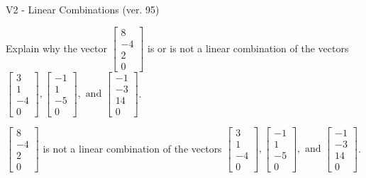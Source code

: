 \begin{exercise}
  \begin{exerciseTitle}V2 - Linear Combinations (ver. 95)\end{exerciseTitle}
  \begin{exerciseStatement}
    Explain why the vector \(\left[\begin{array}{c}
8 \\
-4 \\
2 \\
0
\end{array}\right]\)  is or is not a linear 
	combination of the vectors \(\left[\begin{array}{c}
3 \\
1 \\
-4 \\
0
\end{array}\right] , \left[\begin{array}{c}
-1 \\
1 \\
-5 \\
0
\end{array}\right] , \text{ and } \left[\begin{array}{c}
-1 \\
-3 \\
14 \\
0
\end{array}\right]\).
	


  \end{exerciseStatement}
  \begin{exerciseAnswer}
   \(\left[\begin{array}{c}
8 \\
-4 \\
2 \\
0
\end{array}\right]\) 
  	 is not  
	a linear combination of the vectors \(\left[\begin{array}{c}
3 \\
1 \\
-4 \\
0
\end{array}\right] , \left[\begin{array}{c}
-1 \\
1 \\
-5 \\
0
\end{array}\right] , \text{ and } \left[\begin{array}{c}
-1 \\
-3 \\
14 \\
0
\end{array}\right]\).

	
  


  \end{exerciseAnswer}
\end{exercise}